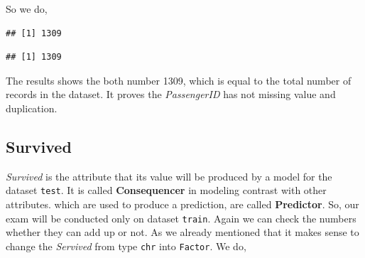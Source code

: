 \documentclass[
]{book}
\newenvironment{Shaded}{\begin{snugshade}}{\end{snugshade}}
\newcommand{\CommentTok}[1]{\textcolor[rgb]{0.56,0.35,0.01}{\textit{#1}}}
\newcommand{\KeywordTok}[1]{\textcolor[rgb]{0.13,0.29,0.53}{\textbf{#1}}}
\newcommand{\NormalTok}[1]{#1}
\newcommand{\OperatorTok}[1]{\textcolor[rgb]{0.81,0.36,0.00}{\textbf{#1}}}
\newcommand{\StringTok}[1]{\textcolor[rgb]{0.31,0.60,0.02}{#1}}
\begin{document}
So we do,

\begin{Shaded}
\end{Shaded}

\begin{verbatim}
## [1] 1309
\end{verbatim}

\begin{Shaded}
\end{Shaded}

\begin{verbatim}
## [1] 1309
\end{verbatim}

The results shows the both number 1309, which is equal to the total number of records in the dataset. It proves the \emph{PassengerID} has not missing value and duplication.

\hypertarget{survived}{%
\subsection{Survived}\label{survived}}

\emph{Survived} is the attribute that its value will be produced by a model for the dataset \texttt{test}. It is called \textbf{Consequencer} in modeling contrast with other attributes. which are used to produce a prediction, are called \textbf{Predictor}. So, our exam will be conducted only on dataset \texttt{train}. Again we can check the numbers whether they can add up or not. As we already mentioned that it makes sense to change the \emph{Servived} from type \texttt{chr} into \texttt{Factor}. We do,

\begin{Shaded}
\end{Shaded}
\end{document}
